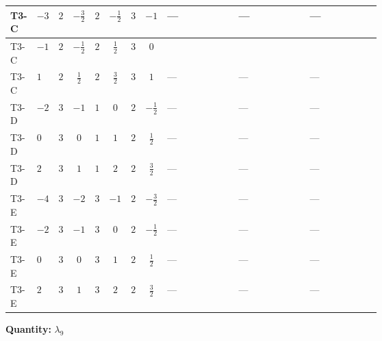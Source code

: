 \documentclass[8pt]{article}
\begin{document}
\begin{landscape}
\begin{longtable}{@{}llcccccc >{\raggedright\arraybackslash}p{0.21\linewidth} >{\raggedright\arraybackslash}p{0.21\linewidth} >{\raggedright\arraybackslash}p{0.21\linewidth}@{}}
T3-C & $-3$ & $2$ & $-\frac{3}{2}$ & $2$ & $-\frac{1}{2}$ & $3$ & $-1$ & --- & --- & --- \\
\midrule
T3-C & $-1$ & $2$ & $-\frac{1}{2}$ & $2$ & $\frac{1}{2}$ & $3$ & $0$ & \scriptsize\adjustbox{max width=\linewidth}{$\begin{gathered} +5 {\lambda_{10}}^2 \\ +5 {\lambda_{11}}^2\end{gathered}$} & \scriptsize\adjustbox{max width=\linewidth}{$\begin{gathered} {\lambda_{9}} (3 T_{\nu}^{(1)}+3 T_{\nu}^{(2)})\end{gathered}$} & \scriptsize\adjustbox{max width=\linewidth}{$\begin{gathered} +{\lambda_{10}} \left(\frac{3}{2} \operatorname{Tr}\!\left({y_2}\,\left({y_1}\right)^{\dagger}\right)+2 {\lambda_{11}}\right)\end{gathered}$} \\
\midrule
T3-C & $1$ & $2$ & $\frac{1}{2}$ & $2$ & $\frac{3}{2}$ & $3$ & $1$ & --- & --- & --- \\
\midrule
T3-D & $-2$ & $3$ & $-1$ & $1$ & $0$ & $2$ & $-\frac{1}{2}$ & --- & --- & --- \\
\midrule
T3-D & $0$ & $3$ & $0$ & $1$ & $1$ & $2$ & $\frac{1}{2}$ & --- & --- & --- \\
\midrule
T3-D & $2$ & $3$ & $1$ & $1$ & $2$ & $2$ & $\frac{3}{2}$ & --- & --- & --- \\
\midrule
T3-E & $-4$ & $3$ & $-2$ & $3$ & $-1$ & $2$ & $-\frac{3}{2}$ & --- & --- & --- \\
\midrule
T3-E & $-2$ & $3$ & $-1$ & $3$ & $0$ & $2$ & $-\frac{1}{2}$ & --- & --- & --- \\
\midrule
T3-E & $0$ & $3$ & $0$ & $3$ & $1$ & $2$ & $\frac{1}{2}$ & --- & --- & --- \\
\midrule
T3-E & $2$ & $3$ & $1$ & $3$ & $2$ & $2$ & $\frac{3}{2}$ & --- & --- & --- \\
\midrule
\bottomrule
\end{longtable}
\clearpage
\noindent\textbf{Quantity: }$\lambda_{9}$\par\smallskip

\end{landscape}
\end{document}
